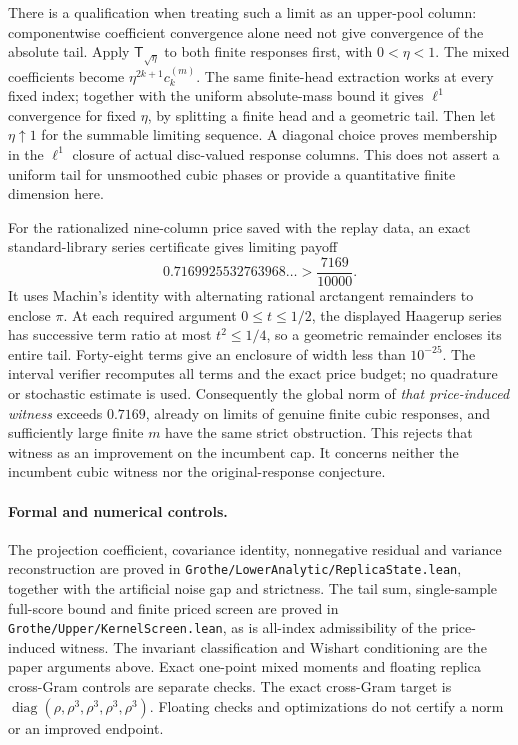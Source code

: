 There is a qualification when treating such a limit as an upper-pool column:
componentwise coefficient convergence alone need not give convergence of the
absolute tail. Apply $\mathsf T_{\sqrt\eta}$ to both finite responses first,
with $0<\eta<1$. The mixed coefficients become
$\eta^{2k+1}c_k^{(m)}$. The same finite-head extraction works at every fixed
index; together with the uniform absolute-mass bound it gives $\ell^1$
convergence for fixed $\eta$, by splitting a finite head and a geometric tail.
Then let $\eta\uparrow1$ for the summable limiting sequence. A diagonal choice
proves membership in the $\ell^1$ closure of actual disc-valued response columns.
This does not assert a uniform tail for unsmoothed cubic phases or provide a
quantitative finite dimension here.

For the rationalized nine-column price saved with the replay data, an exact
standard-library series certificate gives limiting payoff
\[
 0.7169925532763968\ldots>\frac{7169}{10000}.
\]
It uses Machin's identity with alternating rational arctangent remainders to
enclose $\pi$. At each required argument $0\le t\le1/2$, the displayed
Haagerup series has successive term ratio at most $t^2\le1/4$, so a geometric
remainder encloses its entire tail. Forty-eight terms give an enclosure of
width less than $10^{-25}$. The interval verifier recomputes all terms and
the exact price budget; no quadrature or stochastic estimate is used.
Consequently the global norm of \emph{that price-induced witness} exceeds
$0.7169$, already on limits of genuine finite cubic responses, and sufficiently
large finite $m$ have the same strict obstruction. This rejects that witness
as an improvement on the incumbent cap. It concerns neither the incumbent
cubic witness nor the original-response conjecture.

\paragraph{Formal and numerical controls.}
The projection coefficient, covariance identity, nonnegative residual and
variance reconstruction are proved in
\texttt{Grothe/LowerAnalytic/ReplicaState.lean}, together with the artificial
noise gap and strictness. The tail sum, single-sample full-score bound and
finite priced screen are proved in
\texttt{Grothe/Upper/KernelScreen.lean}, as is all-index admissibility of the
price-induced witness. The invariant classification
and Wishart conditioning are the paper arguments above. Exact one-point mixed
moments and floating replica cross-Gram controls are separate checks. The exact
cross-Gram target is
$\operatorname{diag}(\rho,\rho^3,\rho^3,\rho^3,\rho^3)$.
Floating checks and optimizations do not certify a norm or an improved endpoint.
